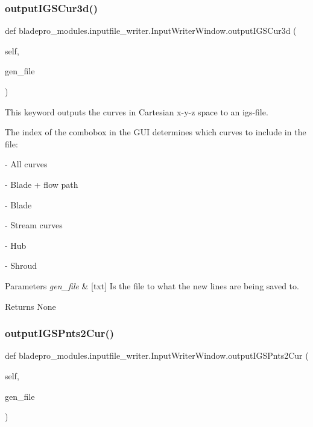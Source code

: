 \subsubsection{\texorpdfstring{output\+I\+G\+S\+Cur3d()}{outputIGSCur3d()}}
{\footnotesize\ttfamily def bladepro\+\_\+modules.\+inputfile\+\_\+writer.\+Input\+Writer\+Window.\+output\+I\+G\+S\+Cur3d (\begin{DoxyParamCaption}\item[{}]{self,  }\item[{}]{gen\+\_\+file }\end{DoxyParamCaption})}



This keyword outputs the curves in Cartesian x-\/y-\/z space to an igs-\/file. 

The index of the combobox in the G\+UI determines which curves to include in the file\+:

\begin{DoxyItemize}
\item {} -\/ All curves \item {} -\/ Blade + flow path \item {} -\/ Blade \item {} -\/ Stream curves \item {} -\/ Hub \item {} -\/ Shroud\end{DoxyItemize}

\begin{DoxyParams}{Parameters}
{\em gen\+\_\+file} & \mbox{[}txt\mbox{]} Is the file to what the new lines are being saved to. \\
\hline
\end{DoxyParams}
\begin{DoxyReturn}{Returns}
None 
\end{DoxyReturn}
\hypertarget{a00073_a60dc6e0ccec5f096ee68f997079abef3}{}\label{a00073_a60dc6e0ccec5f096ee68f997079abef3} 
\subsubsection{\texorpdfstring{output\+I\+G\+S\+Pnts2\+Cur()}{outputIGSPnts2Cur()}}
{\footnotesize\ttfamily def bladepro\+\_\+modules.\+inputfile\+\_\+writer.\+Input\+Writer\+Window.\+output\+I\+G\+S\+Pnts2\+Cur (\begin{DoxyParamCaption}\item[{}]{self,  }\item[{}]{gen\+\_\+file }\end{DoxyParamCaption})}



